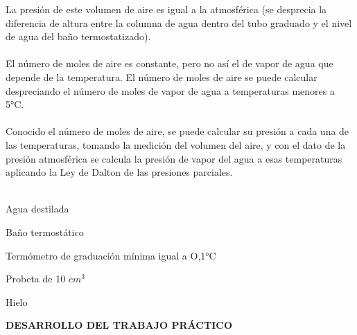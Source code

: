 \documentclass[10pt,a4paper]{article}
\begin{document}
La presión de este volumen de aire es igual a la atmosférica (se desprecia la diferencia de altura entre la columna de agua dentro del tubo graduado y el nivel de agua del baño termostatizado).\\ \\
 
El número de moles de aire es constante, pero no así el de vapor de agua que depende de la temperatura. El número de moles de aire se puede calcular despreciando el número de moles de vapor de agua a temperaturas menores a 5°C.  \\ \\

Conocido el número de moles de aire, se puede calcular su presión a cada una de las temperaturas, tomando la medición del volumen del aire, y con el dato de la presión atmosférica se calcula la presión de vapor del agua a esas temperaturas aplicando la Ley de Dalton de las presiones parciales.  \\ \\

 
 

\begin{list}{\gg}{\textbf{MATERIALES A EMPLEAR }}
\item Agua destilada \\
\item Baño termostático \\
\item Termómetro de graduación mínima igual a O,1°C \\
\item Probeta de 10 $cm^{3} $  \\
\item Hielo \\

\end{list}
 
\textbf{DESARROLLO DEL TRABAJO PRÁCTICO} \\
 
\end{document}
